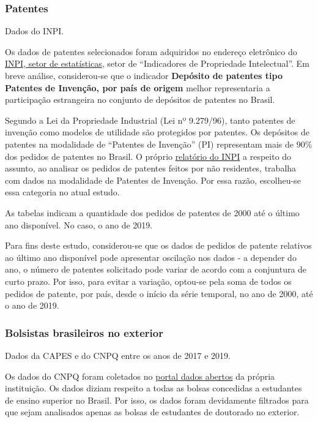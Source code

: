 \documentclass[
]{article}
\begin{document}
\hypertarget{patentes}{%
\subsubsection{Patentes}\label{patentes}}

Dados do INPI.

Os dados de patentes selecionados foram adquiridos no endereço
eletrônico do
\href{https://www.gov.br/inpi/pt-br/central-de-conteudo/estatisticas}{INPI,
setor de estatísticas}, setor de ``Indicadores de Propriedade
Intelectual''. Em breve análise, considerou-se que o indicador
\textbf{Depósito de patentes tipo Patentes de Invenção, por país de
origem} melhor representaria a participação estrangeira no conjunto de
depósitos de patentes no Brasil.

Segundo a Lei da Propriedade Industrial (Lei nº 9.279/96), tanto
patentes de invenção como modelos de utilidade são protegidos por
patentes. Os depósitos de patentes na modalidade de ``Patentes de
Invenção'' (PI) representam mais de 90\% dos pedidos de patentes no
Brasil. O próprio
\href{https://www.gov.br/inpi/pt-br/acesso-a-informacao/pasta-x/boletim-mensal/arquivos/documentos/indicadores-de-pi_2019.pdf}{relatório
do INPI} a respeito do assunto, ao analisar os pedidos de patentes
feitos por não residentes, trabalha com dados na modalidade de Patentes
de Invenção. Por essa razão, escolheu-se essa categoria no atual estudo.

As tabelas indicam a quantidade dos pedidos de patentes de 2000 até o
último ano disponível. No caso, o ano de 2019.

Para fins deste estudo, considerou-se que os dados de pedidos de patente
relativos ao último ano disponível pode apresentar oscilação nos dados -
a depender do ano, o número de patentes solicitado pode variar de acordo
com a conjuntura de curto prazo. Por isso, para evitar a variação,
optou-se pela soma de todos os pedidos de patente, por país, desde o
início da série temporal, no ano de 2000, até o ano de 2019.

\hypertarget{bolsistas-brasileiros-no-exterior}{%
\subsubsection{Bolsistas brasileiros no
exterior}\label{bolsistas-brasileiros-no-exterior}}

Dados da CAPES e do CNPQ entre os anos de 2017 e 2019.

Os dados do CNPQ foram coletados no
\href{http://dadosabertos.cnpq.br/pt_BR/dataset?q=bolsas}{portal dados
abertos} da própria instituição. Os dados diziam respeito a todas as
bolsas concedidas a estudantes de ensino superior no Brasil. Por isso,
os dados foram devidamente filtrados para que sejam analisados apenas as
bolsas de estudantes de doutorado no exterior.
\end{document}
